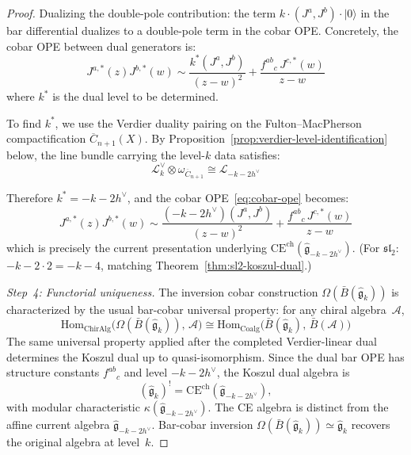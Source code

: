 \begin{proof}
Dualizing the double-pole contribution: the term $k \cdot (J^a, J^b) \cdot |0\rangle$ in the bar differential dualizes to a double-pole term in the cobar OPE. Concretely, the cobar OPE between dual generators is:
\begin{equation}\label{eq:cobar-ope}
J^{a,*}(z) J^{b,*}(w) \sim \frac{k^* (J^a, J^b)}{(z-w)^2} + \frac{f^{ab}{}_{c}\, J^{c,*}(w)}{z-w}
\end{equation}
where $k^*$ is the dual level to be determined.

To find $k^*$, we use the Verdier duality pairing on the
Fulton--MacPherson compactification $\overline{C}_{n+1}(X)$.
By Proposition~\ref{prop:verdier-level-identification} below,
the line bundle carrying the level-$k$ data satisfies:
\begin{equation}
\mathcal{L}_k^\vee \otimes \omega_{\overline{C}_{n+1}} \cong \mathcal{L}_{-k-2h^\vee}
\end{equation}

Therefore $k^* = -k - 2h^\vee$, and the cobar OPE~\eqref{eq:cobar-ope} becomes:
\begin{equation}
J^{a,*}(z) J^{b,*}(w) \sim \frac{(-k-2h^\vee)(J^a, J^b)}{(z-w)^2} + \frac{f^{ab}{}_{c}\, J^{c,*}(w)}{z-w}
\end{equation}
which is precisely the current presentation underlying
\(\mathrm{CE}^{\mathrm{ch}}(\widehat{\mathfrak{g}}_{-k-2h^\vee})\).
(For $\mathfrak{sl}_2$: $-k-2 \cdot 2 = -k-4$, matching
Theorem~\ref{thm:sl2-koszul-dual}.)

\emph{Step~4: Functorial uniqueness.}
The inversion cobar construction
\(\Omega(\bar{B}(\widehat{\mathfrak{g}}_k))\) is characterized by the
usual bar-cobar universal property: for any chiral algebra~$\mathcal{A}$,
\begin{equation}
\mathrm{Hom}_{\text{ChirAlg}}\bigl(\Omega(\bar{B}(\widehat{\mathfrak{g}}_k)),\, \mathcal{A}\bigr) \cong \mathrm{Hom}_{\text{Coalg}}\bigl(\bar{B}(\widehat{\mathfrak{g}}_k),\, \bar{B}(\mathcal{A})\bigr)
\end{equation}
The same universal property applied after the completed Verdier-linear
dual determines the Koszul dual up to quasi-isomorphism.  Since the
dual bar OPE has structure constants $f^{ab}{}_c$ and level
$-k-2h^\vee$, the Koszul dual algebra is
\[
(\widehat{\mathfrak{g}}_k)^!
= \mathrm{CE}^{\mathrm{ch}}(\widehat{\mathfrak{g}}_{-k-2h^\vee}),
\]
with modular characteristic
\(\kappa(\widehat{\mathfrak{g}}_{-k-2h^\vee})\).  The CE algebra is
distinct from the affine current algebra
\(\widehat{\mathfrak{g}}_{-k-2h^\vee}\).  Bar-cobar inversion
\(\Omega(\bar{B}(\widehat{\mathfrak{g}}_k)) \simeq
\widehat{\mathfrak{g}}_k\) recovers the original algebra at level~$k$.


\end{proof}
